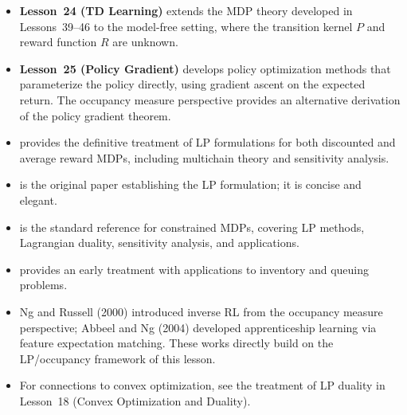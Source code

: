 \documentclass[11pt,a4paper]{article}
\begin{document}
\begin{itemize}
    \item \textbf{Lesson~24 (TD Learning)} extends the MDP theory
    developed in Lessons~39--46 to the model-free setting, where
    the transition kernel $P$ and reward function $R$ are unknown.
    \item \textbf{Lesson~25 (Policy Gradient)} develops policy
    optimization methods that parameterize the policy directly,
    using gradient ascent on the expected return. The occupancy
    measure perspective provides an alternative derivation of the
    policy gradient theorem.
    \item \citet[Chapters 6 and 8--9]{puterman2014} provides the
    definitive treatment of LP formulations for both discounted and
    average reward MDPs, including multichain theory and sensitivity
    analysis.
    \item \citet{manne1960} is the original paper establishing the
    LP formulation; it is concise and elegant.
    \item \citet{altman1999} is the standard reference for
    constrained MDPs, covering LP methods, Lagrangian duality,
    sensitivity analysis, and applications.
    \item \citet{derman1970} provides an early treatment with
    applications to inventory and queuing problems.
    \item Ng and Russell (2000) introduced inverse RL from the
    occupancy measure perspective; Abbeel and Ng (2004) developed
    apprenticeship learning via feature expectation matching.
    These works directly build on the LP/occupancy framework of
    this lesson.
    \item For connections to convex optimization, see the treatment
    of LP duality in Lesson~18 (Convex Optimization and Duality).
\end{itemize}


\end{document}
